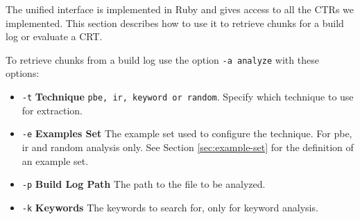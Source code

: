 \documentclass[\myrootdir/main.tex]{subfiles}
\begin{document}


The unified interface is implemented in Ruby and gives access to all the CTRs we implemented.
This section describes how to use it to retrieve chunks for a build log or evaluate a CRT.

To retrieve chunks from a build log use the option \texttt{-a analyze} with these options:
\begin{itemize}
    \item \texttt{-t} \textbf{Technique} \texttt{pbe, ir, keyword or random}. Specify which technique to use for extraction.
    \item \texttt{-e} \textbf{Examples Set} The example set used to configure the technique. For pbe, ir and random analysis only. See Section \ref{sec:example-set} for the definition of an example set.
    \item \texttt{-p} \textbf{Build Log Path} The path to the file to be analyzed.
    \item \texttt{-k} \textbf{Keywords} The keywords to search for, only for keyword analysis.
\end{itemize}
\end{document}
